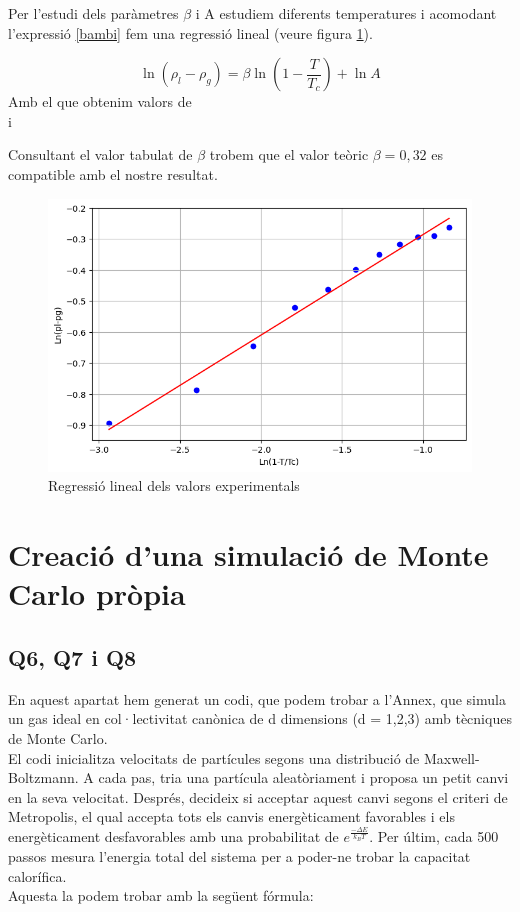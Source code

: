 \documentclass{article}
\begin{document}
	Per l'estudi dels paràmetres $\beta$ i A estudiem diferents temperatures i acomodant l'expressió \ref{bambi} fem una regressió lineal (veure figura \ref{1}).
	
	\begin{equation}
		\ln(\rho_l-\rho_g)=\beta \ln\left(1-\frac{T}{T_c}\right)+ \ln A
	\end{equation}
	Amb el que obtenim valors de
	\\
	 i 
	
	Consultant el valor tabulat de $\beta$ trobem que el valor teòric $\beta=0,32$ es compatible amb el nostre resultat.
	\begin{figure}[h!] 
		\centering
		\includegraphics[width=0.7\linewidth]{regresionq5.png}
		\caption{Regressió lineal dels valors experimentals}
		\label{1}
	\end{figure}
	
	
	
	\section{Creació d'una simulació de Monte Carlo pròpia}
	\subsection*{Q6, Q7 i Q8}
	En aquest apartat hem generat un codi, que podem trobar a l'Annex, que simula un gas ideal en col·lectivitat canònica de d dimensions (d = 1,2,3) amb tècniques de Monte Carlo.
	\\
	El codi inicialitza velocitats de partícules segons una distribució de Maxwell-Boltzmann. A cada pas, tria una partícula aleatòriament i proposa un petit canvi en la seva velocitat. Després, decideix si acceptar aquest canvi segons el criteri de Metropolis, el qual accepta tots els canvis energèticament favorables i els energèticament desfavorables amb una probabilitat de $e^{\frac{-\Delta E}{k_BT}}$. Per últim, cada 500 passos mesura l'energia total del sistema per a poder-ne trobar la capacitat calorífica.
	\\
	Aquesta la podem trobar amb la següent fórmula:
	
\end{document}
